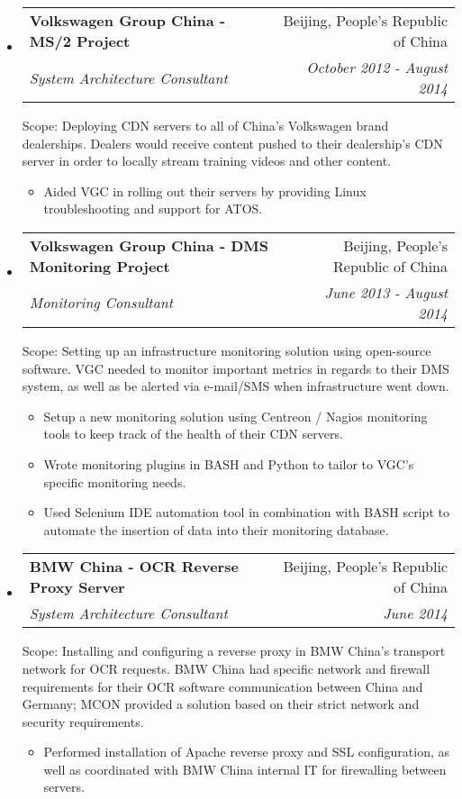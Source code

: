 \documentclass[a4paper,11pt]{article}
\makeatletter
\newlength{\outerbordwidth}
\newcommand{\resitem}[1]{\item #1 \vspace{-2pt}}
\newcommand{\resheading}[1]{\vspace{8pt}
  \parbox{\textwidth}{\setlength{\FrameSep}{\outerbordwidth}
    \begin{shaded}
\setlength{\fboxsep}{0pt}\framebox[\textwidth][l]{\setlength{\fboxsep}{4pt}\fcolorbox{shadecolorB}{shadecolorB}{\textbf{\sffamily{\mbox{~}\makebox[6.762in][l]{\large #1} \vphantom{p\^{E}}}}}}
    \end{shaded}
  }\vspace{-5pt}
}
\newcommand{\ressubheading}[4]{
\begin{tabular*}{6.5in}{l@{\cftdotfill{\cftsecdotsep}\extracolsep{\fill}}r}
		\textbf{#1} & #2 \\
		\textit{#3} & \textit{#4} \\
\end{tabular*}\vspace{-6pt}}
\makeatother
\begin{document}
\resheading{Projects}
\begin{itemize}
\item
	\ressubheading{Volkswagen Group China - MS/2 Project}{Beijing, People's Republic of China}{System Architecture Consultant}{October 2012 - August 2014}
	\linebreak
	\linebreak
	\linebreak
	Scope: Deploying CDN servers to all of China's Volkswagen brand dealerships. Dealers would receive content pushed to their dealership's CDN server in order to locally stream training videos and other content.
	\begin{itemize}
		\resitem{Aided VGC in rolling out their servers by providing Linux troubleshooting and support for ATOS.}
	\end{itemize}

\item
	\ressubheading{Volkswagen Group China - DMS Monitoring Project}{Beijing, People's Republic of China}{Monitoring Consultant}{June 2013 - August 2014}
	\linebreak
	\linebreak
	\linebreak
	Scope: Setting up an infrastructure monitoring solution using open-source software. VGC needed to monitor important metrics in regards to their DMS system, as well as be alerted via e-mail/SMS when infrastructure went down.
	\begin{itemize}
		\resitem{Setup a new monitoring solution using Centreon / Nagios monitoring tools to keep track of the health of their CDN servers.}
		\resitem{Wrote monitoring plugins in BASH and Python to tailor to VGC's specific monitoring needs.}
		\resitem{Used Selenium IDE automation tool in combination with BASH script to automate the insertion of data into their monitoring database.}
	\end{itemize}

\item
	\ressubheading{BMW China - OCR Reverse Proxy Server}{Beijing, People's Republic of China}{System Architecture Consultant}{June 2014}
	\linebreak
	\linebreak
	\linebreak
	Scope: Installing and configuring a reverse proxy in BMW China's transport network for OCR requests. BMW China had specific network and firewall requirements for their OCR software communication between China and Germany; MCON provided a solution based on their strict network and security requirements.
	\begin{itemize}
		\resitem{Performed installation of Apache reverse proxy and SSL configuration, as well as coordinated with BMW China internal IT for firewalling between servers.}
	\end{itemize}


\end{itemize}
\end{document}
